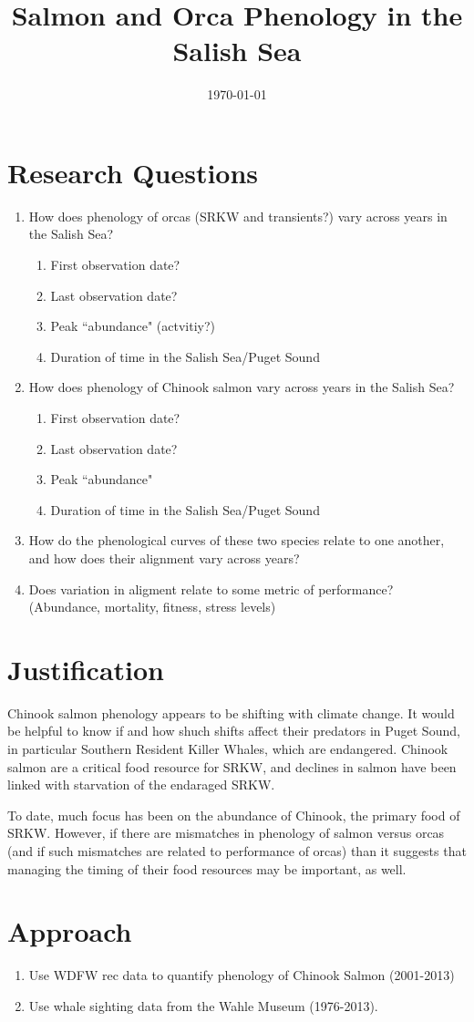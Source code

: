 \documentclass{article}
\begin{document}


\title{Salmon and Orca Phenology in the Salish Sea}
\date{\today}
\maketitle
\section* {Research Questions}
\begin{enumerate}
\item How does phenology of orcas (SRKW and transients?) vary across years in the Salish Sea? 
\begin{enumerate}
\item First observation date?
\item Last observation date?
\item Peak ``abundance" (actvitiy?)
\item Duration of time in the Salish Sea/Puget Sound
\end{enumerate}
\item How does phenology of Chinook salmon vary across years in the Salish Sea? 
\begin{enumerate}
\item First observation date?
\item Last observation date?
\item Peak ``abundance"
\item Duration of time in the Salish Sea/Puget Sound
\end{enumerate}
\item How do the phenological curves of these two species relate to one another, and how does their alignment vary across years?
\item Does variation in aligment relate to some metric of performance? (Abundance, mortality, fitness, stress levels)
\end{enumerate}

\section* {Justification}
\par Chinook salmon phenology appears to be shifting with climate change. It would be helpful to know if and how shuch shifts affect their predators in Puget Sound, in particular Southern Resident Killer Whales, which are endangered. Chinook salmon are a critical food resource for SRKW, and declines in salmon have been linked with starvation of the endaraged SRKW.
\par To date, much focus has been on the abundance of Chinook, the primary food of SRKW. However, if there are mismatches in phenology of salmon versus orcas (and if such mismatches are related to performance of orcas) than it suggests that managing the timing of their food resources may be important, as well. 
\section* {Approach}
\begin{enumerate}
\item Use WDFW rec data to quantify phenology of Chinook Salmon (2001-2013)
\item Use whale sighting data from the Wahle Museum (1976-2013).
\end{enumerate}
\end{document}
